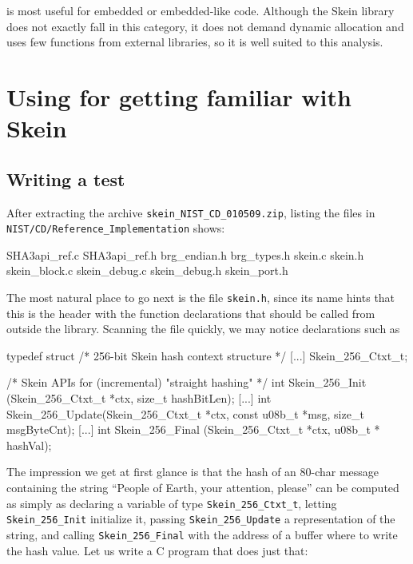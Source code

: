\documentclass{frama-c-book}
\begin{document}
\Eva{} is most useful for embedded or embedded-like
code. Although the Skein library does not exactly fall in this category,
it does not demand dynamic allocation and uses few functions from external
libraries, so it is well suited to this analysis.

\section{Using \Eva{} for getting familiar with Skein}

\subsection{Writing a test}

After extracting the archive \lstinline|skein_NIST_CD_010509.zip|,
listing the files in\\
\lstinline|NIST/CD/Reference_Implementation| shows:
\begin{listing-nonumber}
SHA3api_ref.c
SHA3api_ref.h
brg_endian.h
brg_types.h
skein.c
skein.h
skein_block.c
skein_debug.c
skein_debug.h
skein_port.h
\end{listing-nonumber}

The most natural place to go next is the file \lstinline|skein.h|,
since its name hints that this is the header with the
function declarations that should be called from outside the library.
Scanning the file quickly, we may notice declarations such as
\begin{listing-nonumber}
typedef struct /*  256-bit Skein hash context structure */
    {
      [...]
    } Skein_256_Ctxt_t;

/*   Skein APIs for (incremental) "straight hashing" */
int  Skein_256_Init  (Skein_256_Ctxt_t *ctx, size_t hashBitLen);
[...]
int  Skein_256_Update(Skein_256_Ctxt_t *ctx, const u08b_t *msg,
                                                 size_t msgByteCnt);
[...]
int  Skein_256_Final (Skein_256_Ctxt_t *ctx, u08b_t * hashVal);
\end{listing-nonumber}

The impression we get at first glance is that the hash
of an 80-char message containing
the string ``People of Earth, your attention, please''
can be computed as simply as declaring a variable of
type \lstinline|Skein_256_Ctxt_t|, letting \lstinline|Skein_256_Init|
initialize it, passing \lstinline|Skein_256_Update| a representation
of the string, and calling \lstinline|Skein_256_Final| with the
address of a buffer where to write the hash value.
Let us write a C program that does just that:
\end{document}
